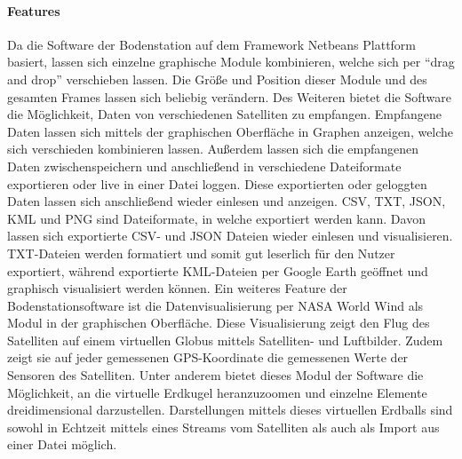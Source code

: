 \paragraph{Features}
Da die Software der Bodenstation auf dem Framework Netbeans Plattform basiert, lassen sich einzelne graphische Module kombinieren, welche sich per ``drag and drop'' verschieben lassen. Die Größe und Position dieser Module und des gesamten Frames lassen sich beliebig verändern. Des Weiteren bietet die Software die Möglichkeit, Daten von verschiedenen Satelliten zu empfangen. Empfangene Daten lassen sich mittels der graphischen Oberfläche in Graphen anzeigen, welche sich verschieden kombinieren lassen. Außerdem lassen sich die empfangenen Daten zwischenspeichern und anschließend in verschiedene Dateiformate exportieren oder live in einer Datei loggen. Diese exportierten oder geloggten Daten lassen sich anschließend wieder einlesen und anzeigen. CSV, TXT, JSON, KML und PNG sind Dateiformate, in welche exportiert werden kann. Davon lassen sich exportierte CSV- und JSON Dateien wieder einlesen und visualisieren. TXT-Dateien werden formatiert und somit gut leserlich für den Nutzer exportiert, während exportierte KML-Dateien per Google Earth geöffnet und graphisch visualisiert werden können. Ein weiteres Feature der Bodenstationsoftware ist die Datenvisualisierung per NASA World Wind als Modul in der graphischen Oberfläche. Diese Visualisierung zeigt den Flug des Satelliten auf einem virtuellen Globus mittels Satelliten- und Luftbilder. Zudem zeigt sie auf jeder gemessenen GPS-Koordinate die gemessenen Werte der Sensoren des Satelliten. Unter anderem bietet dieses Modul der Software die Möglichkeit, an die virtuelle Erdkugel heranzuzoomen und einzelne Elemente dreidimensional darzustellen. Darstellungen mittels dieses virtuellen Erdballs sind sowohl in Echtzeit mittels eines Streams vom Satelliten als auch als Import aus einer Datei möglich.
